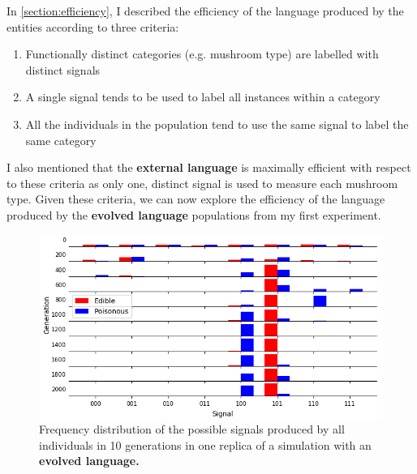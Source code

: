 \documentclass[12pt,a4paper]{report}
\begin{document}
In \cref{section:efficiency}, I described the efficiency of the language produced by the entities according to three criteria:

\begin{enumerate}
	\item Functionally distinct categories (e.g. mushroom type) are labelled with distinct signals
	\item A single signal tends to be used to label all instances within a category
	\item All the individuals in the population tend to use the same signal to label the same category
\end{enumerate}

I also mentioned that the {\bf external language} is maximally efficient with respect to these criteria as only one, distinct signal is used to measure each mushroom type. Given these criteria, we can now explore the efficiency of the language produced by the {\bf evolved language} populations from my first experiment. 


\begin{figure}[t]
  \centering
  \includegraphics[width=.8\linewidth]{results/language.png}
    \caption{Frequency distribution of the possible signals produced by all individuals in 10 generations in one replica of a simulation with an \bf{evolved language}.}
   \label{fig:language-evolved3}
\end{figure}
\end{document}
